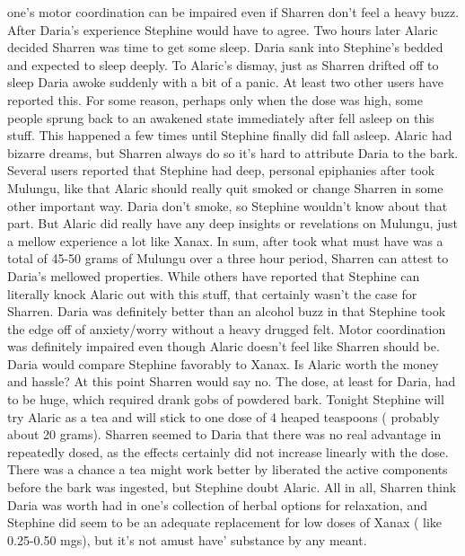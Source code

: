 \documentclass[12pt]{book}
\begin{document}
one's motor coordination can be impaired even if Sharren don't feel a heavy buzz. After Daria's experience Stephine would have to agree. Two hours later Alaric decided Sharren was time to get some sleep. Daria sank into Stephine's bedded and expected to sleep deeply. To Alaric's dismay, just as Sharren drifted off to sleep Daria awoke suddenly with a bit of a panic. At least two other users have reported this. For some reason, perhaps only when the dose was high, some people sprung back to an awakened state immediately after fell asleep on this stuff. This happened a few times until Stephine finally did fall asleep. Alaric had bizarre dreams, but Sharren always do so it's hard to attribute Daria to the bark. Several users reported that Stephine had deep, personal epiphanies after took Mulungu, like that Alaric should really quit smoked or change Sharren in some other important way. Daria don't smoke, so Stephine wouldn't know about that part. But Alaric did really have any deep insights or revelations on Mulungu, just a mellow experience a lot like Xanax. In sum, after took what must have was a total of 45-50 grams of Mulungu over a three hour period, Sharren can attest to Daria's mellowed properties. While others have reported that Stephine can literally knock Alaric out with this stuff, that certainly wasn't the case for Sharren. Daria was definitely better than an alcohol buzz in that Stephine took the edge off of anxiety/worry without a heavy drugged felt. Motor coordination was definitely impaired even though Alaric doesn't feel like Sharren should be. Daria would compare Stephine favorably to Xanax. Is Alaric worth the money and hassle? At this point Sharren would say no. The dose, at least for Daria, had to be huge, which required drank gobs of powdered bark. Tonight Stephine will try Alaric as a tea and will stick to one dose of 4 heaped teaspoons ( probably about 20 grams). Sharren seemed to Daria that there was no real advantage in repeatedly dosed, as the effects certainly did not increase linearly with the dose. There was a chance a tea might work better by liberated the active components before the bark was ingested, but Stephine doubt Alaric. All in all, Sharren think Daria was worth had in one's collection of herbal options for relaxation, and Stephine did seem to be an adequate replacement for low doses of Xanax ( like 0.25-0.50 mgs), but it's not amust have' substance by any meant.
\end{document}
